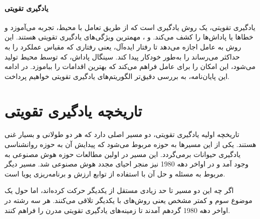 \paragraph{یادگیری تقویتی}
یادگیری تقویتی، یک روش یادگیری است که از طریق تعامل با محیط، تجربه می‌‌آموزد و خطاها یا پاداش‌ها را کشف می‌کند.  و ، مهمترین ویژگی‌های یادگیری تقویتی هستند. این روش به عامل اجازه می‌دهد تا رفتار ایده‌آل، یعنی رفتاری که مقیاس عملکرد را به حداکثر می‌رساند را به‌طور خودکار پیدا کند. سینگال پاداش، که توسط محیط تولید می‌شود، این امکان را برای عامل فراهم می‌کند که بهترین اقدامات را بباموزد. در ادامه این پایان‌نامه، به بررسی دقیق‌تر الگوریتم‌های یادگیری تقویتی خواهیم پرداخت.


\section{تاریخچه یادگیری تقویتی}
تاریخچه اولیه یادگیری تقویتی، دو مسیر اصلی دارد که هر دو طولانی و بسیار غنی هستند. یکی از این مسیرها به حوزه  مربوط می‌شود که پیدایش آن به حوزه روانشناسی یادگیری حیوانات برمی‌گردد. این مسیر در اولین مطالعات حوزه هوش مصنوعی به وجود آمد و در اواخر دهه 1980 نیز منجر احیای مجدد هوش مصنوعی شد. مسیر دیگر مربوط به مسئله  و حل آن با استفاده از توابع ارزش و برنامه‌ریزی پویا است.

 اگر چه این دو مسیر تا حد زیادی مستقل از یکدیگر حرکت کرده‌اند،  اما حول یک موضوع سوم و کمتر مشخص یعنی روش‌های   با یکدیگر تلاقی می‌کنند. هر سه رشته در اواخر دهه 1980 گرد‌هم آمدند تا زمینه‌های یادگیری تقویتی مدرن را فراهم کنند.



